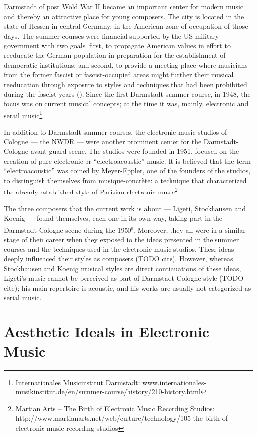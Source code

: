 \documentclass[a4paper,11pt]{article}
\begin{document}
Darmstadt of post Wold War II became an important center for modern music and thereby an attractive place for young composers.
The city is located in the state of Hessen in central Germany, in the American zone of occupation of those days.
The summer courses were financial supported by the US military government with two goals:
first, to propagate American values in effort to reeducate the German population in preparation for the establishment of democratic institutions;
and second, to provide a meeting place where musicians from the former fascist or fascist-occupied areas might further their musical reeducation through exposure to styles and techniques that had been prohibited during the fascist years (\cite{darmstadt_oxford}).
Since the first Darmstadt summer course, in 1948, the focus was on current musical concepts;
at the time it was, mainly, electronic and serail music\footnote{Internationales Musicinstitut Darmstadt: www.internationales-musikinstitut.de/en/summer-course/history/210-history.html}.

In addition to Darmstadt summer courses, the electronic music studios of Cologne --- the NWDR --- were another prominent center for the Darmstadt-Cologne avant guard scene.
The studios were founded in 1951, focused on the creation of pure electronic or ``electroacoustic'' music.
It is believed that the term ``electroacoustic'' was coined by Meyer-Eppler, one of the founders of the studios, to distinguish themselves from musique-concr{\`e}te:
a technique that characterized the already established style of Parisian electronic music\footnote{Martian Arts -- The Birth of Electronic Music Recording Studios: http://www.martianarts.net/web/culture/technology/105-the-birth-of-electronic-music-recording-studios}.

The three composers that the current work is about --- Ligeti, Stockhausen and Koenig --- found themselves, each one in its own way, taking part in the Darmstadt-Cologne scene during the 1950\textsuperscript{s}.
Moreover, they all were in a similar stage of their career when they exposed to the ideas presented in the summer courses and the techniques used in the electronic music studios.
These ideas deeply influenced their styles as composers (TODO cite).
However, whereas Stockhausen and Koenig musical styles are direct continuations of these ideas, Ligeti's music cannot be perceived as part of Darmstadt-Cologne style (TODO cite);
his main repertoire is acoustic, and his works are usually not categorized as serial music.

\section{Aesthetic Ideals in Electronic Music}
\label{sec:aesthetic_ideals_in_electronic_music}
\end{document}
